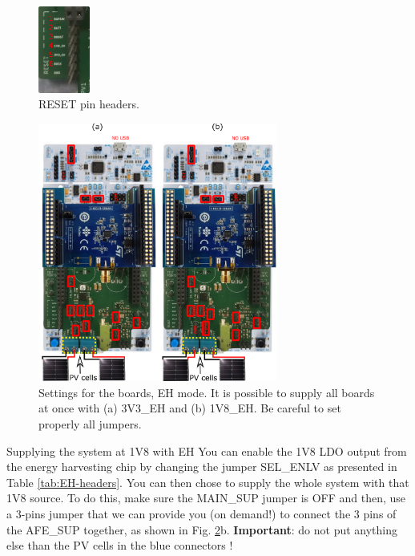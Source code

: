 \begin{figure}[h!]
    \centering
    \includegraphics[width=0.15\textwidth]{figs/reset-procedure.png}
    \caption{RESET pin headers.}
    \label{fig:reset-procedure}
\end{figure}

\begin{figure}[h!]
    \centering
    \includegraphics[width=0.7\textwidth]{figs/settings-mode-eh.png}
    \caption{Settings for the boards, EH mode. It is possible to supply all boards at once with (a) 3V3\_EH and (b) 1V8\_EH. Be careful to set properly all jumpers.}
    \label{fig:settings-mode-eh}
\end{figure}

\begin{bclogo}[couleur = gray!20, arrondi = 0.2, logo=\bcinfo]{Supplying the system at 1V8 with EH}
You can enable the 1V8 LDO output from the energy harvesting chip by changing the jumper SEL\_ENLV as presented in Table \ref{tab:EH-headers}. You can then chose to supply the whole system with that 1V8 source. To do this, make sure the MAIN\_SUP jumper is OFF and then, use a 3-pins jumper that we can provide you (on demand!) to connect the 3 pins of the AFE\_SUP together, as shown in Fig. \ref{fig:settings-mode-eh}b. \textbf{Important}: do not put anything else than the PV cells in the blue connectors !
\end{bclogo}
